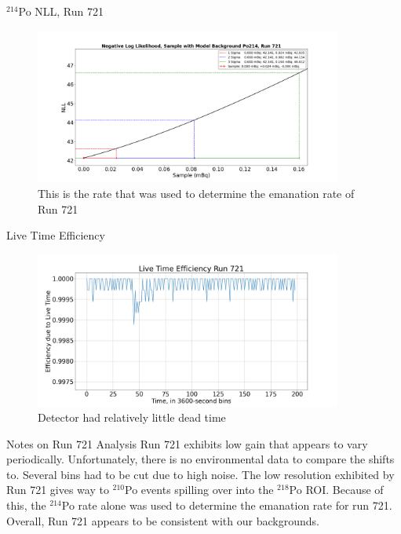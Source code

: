 \documentclass[aspectratio=169]{beamer}
\begin{document}
\begin{frame}{$^{214}$Po NLL, Run 721}
    \begin{figure}
        \begin{center}
            \includegraphics[width=0.9\textwidth]
            {assets/721/NLL214.png}
            \caption{This is the rate that was used to determine the emanation rate of Run 721}
        \end{center}
    \end{figure}
\end{frame}

\begin{frame}{Live Time Efficiency}
    \begin{figure}
        \begin{center}
            \includegraphics[width=0.9\textwidth]
            {assets/721/LTE.png}
            \caption{Detector had relatively little dead time}
        \end{center}
    \end{figure}
\end{frame}

\begin{frame}{Notes on Run 721 Analysis}
    Run 721 exhibits low gain that appears to vary periodically.
    Unfortunately, there is no environmental data to compare the shifts to.
    Several bins had to be cut due to high noise.
    The low resolution exhibited by Run 721 gives way to $^{210}$Po events spilling over
    into the $^{218}$Po ROI.
    Because of this, the $^{214}$Po rate alone was used to determine the emanation rate
    for run 721.
    Overall, Run 721 appears to be consistent with our backgrounds.

    \hyperlink{RvT_721}{}
\end{frame}
\end{document}
